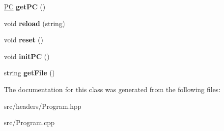 \begin{DoxyCompactItemize}
\item 
\hypertarget{classProgram_a7f77cefd84d0a9f31bc2909af70980bf}{\hyperlink{classPC}{P\-C} {\bfseries get\-P\-C} ()}\label{classProgram_a7f77cefd84d0a9f31bc2909af70980bf}

\item 
\hypertarget{classProgram_a2397451fffeeca19728ebbf2ea68f26b}{void {\bfseries reload} (string)}\label{classProgram_a2397451fffeeca19728ebbf2ea68f26b}

\item 
\hypertarget{classProgram_aeb6d22c6dc2202ea374fc6b9ce81a2f4}{void {\bfseries reset} ()}\label{classProgram_aeb6d22c6dc2202ea374fc6b9ce81a2f4}

\item 
\hypertarget{classProgram_a8cb065b057057bb900d290b1df63563f}{void {\bfseries init\-P\-C} ()}\label{classProgram_a8cb065b057057bb900d290b1df63563f}

\item 
\hypertarget{classProgram_af1e2b12f80a13528c39692d9ee1a7bcb}{string {\bfseries get\-File} ()}\label{classProgram_af1e2b12f80a13528c39692d9ee1a7bcb}

\end{DoxyCompactItemize}


The documentation for this class was generated from the following files\-:\begin{DoxyCompactItemize}
\item 
src/headers/Program.\-hpp\item 
src/Program.\-cpp\end{DoxyCompactItemize}
